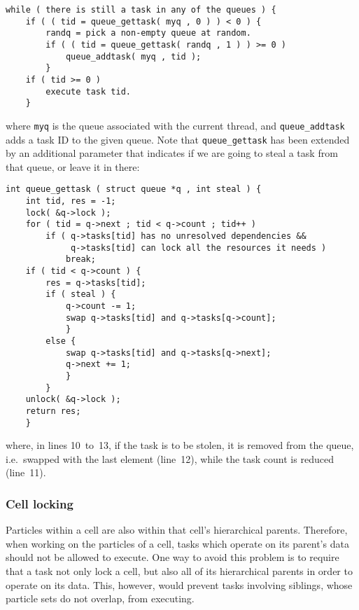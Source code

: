 \documentclass[final]{siamltex}
\begin{document}
\begin{center}\begin{minipage}{0.8\textwidth}
    \begin{lstlisting}
while ( there is still a task in any of the queues ) {
    if ( ( tid = queue_gettask( myq , 0 ) ) < 0 ) {
        randq = pick a non-empty queue at random.
        if ( ( tid = queue_gettask( randq , 1 ) ) >= 0 )
            queue_addtask( myq , tid );
        }
    if ( tid >= 0 )
        execute task tid.
    }
    \end{lstlisting}
\end{minipage}\end{center}

\noindent where {\tt myq} is the queue associated with the
current thread, and {\tt queue\_addtask} adds a task ID
to the given queue.
Note that {\tt queue\_gettask} has been extended by an
additional parameter that indicates if we are going to steal
a task from that queue, or leave it in there:

\begin{center}\begin{minipage}{0.8\textwidth}
    \begin{lstlisting}
int queue_gettask ( struct queue *q , int steal ) {
    int tid, res = -1;
    lock( &q->lock );
    for ( tid = q->next ; tid < q->count ; tid++ )
        if ( q->tasks[tid] has no unresolved dependencies &&
             q->tasks[tid] can lock all the resources it needs )
            break;
    if ( tid < q->count ) {
        res = q->tasks[tid];
        if ( steal ) {
            q->count -= 1;
            swap q->tasks[tid] and q->tasks[q->count];
            }
        else {
            swap q->tasks[tid] and q->tasks[q->next];
            q->next += 1;
            }
        }
    unlock( &q->lock );
    return res;
    }
    \end{lstlisting}
\end{minipage}\end{center}

\noindent where, in lines 10~to~13, if the task is to be stolen,
it is removed from the queue, i.e.~swapped with the last element (line~12),
while the task count is reduced (line~11).


\subsubsection{Cell locking}

Particles within a cell are also within that cell's hierarchical
parents.
Therefore, when working on the particles of a cell, tasks which
operate on its parent's data should not be allowed to execute.
One way to avoid this problem is to require that a task
not only lock a cell, but also all of its hierarchical
parents in order to operate on its data.
This, however, would prevent tasks involving siblings,
whose particle sets do not overlap, from executing.
\end{document}

